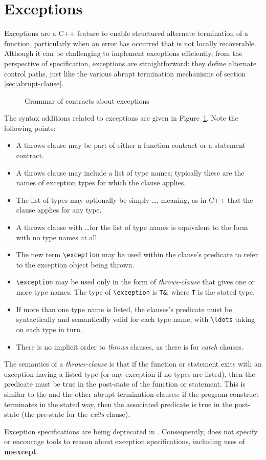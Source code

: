 \section{Exceptions}
\label{sec:exceptions}

Exceptions are a C++ feature to enable structured alternate termination of a function, particularly when an error has occurred that is not locally recoverable. Although it can be challenging to implement exceptions efficiently, from the perspective of specification, exceptions are straightforward: they define alternate control paths, just like the various abrupt termination mechanisms of section \ref{sec:abrupt-clause}.

\begin{figure}[t]
	\begin{cadre}
		
	\end{cadre}
	\caption{Grammar of contracts about exceptions}
	\label{fig:gram:throws-clause}
\end{figure}


The syntax additions related to exceptions are given in 
Figure~\ref{fig:gram:throws-clause}. Note the following points:
\begin{itemize}
\item A throws clause may be part of either a function contract or a statement contract.
\item A throws clause may include a list of type names; typically these are the names of exception types for which the
clause applies.
\item The list of types may optionally be simply \ldots, meaning, as in C++ that the clause applies for any type.
\item A throws clause with \ldots for the list of type names is equivalent to the form with no type names at all.
\item The new term \lstinline|\exception| may be used within the clause's predicate to refer to the exception object being thrown. 
\item \lstinline|\exception| may be used only in the form of \textsl{throws-clause} that gives one or more type names. The type of \lstinline|\exception| is \lstinline|T&|, where \lstinline|T| is the stated type.
\item If more than one type name is listed, the clauses's predicate must be syntactically and semantically valid for each type name, with \lstinline|\ldots| taking on each type in turn.
\item There is no implicit order to \textsl{throws} clauses, as there is for \textsl{catch} clauses.
\end{itemize}
The semantics of a \textsl{throws-clause} is that if the function or statement exits with an exception having a listed type (or any exception if no types are listed), then the predicate must be true in the post-state of the function or statement. This is similar to the \ensures and the other abrupt termination clauses: if the program construct terminates in the stated way, then the associated predicate is true in the post-state (the pre-state for the \textsl{exits} clause).

Exception specifications are being deprecated in \lang. Consequently, \NAME{} does not specify or encourage tools to reason about \lang{} exception specifications, including uses of \textbf{noexcept}.


